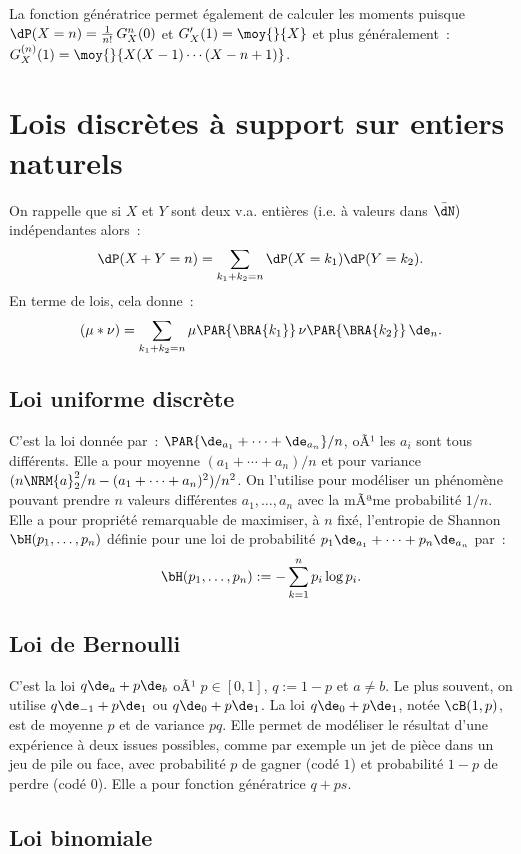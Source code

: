 {{La fonction génératrice permet également de calculer les moments puisque
$\dP(X=n)=\frac{1}{n!}\,G^{n}_X(0)$ et $G_X'(1)=\moy{}{X}$ et plus
généralement~: $G_X^{(n)}(1)=\moy{}{X(X-1)\cdots(X-n+1)}$.


%
\section{Lois discrètes à support sur entiers naturels}
%

On rappelle que si $X$ et $Y$ sont deux v.a. entières (i.e. à valeurs dans
$\bar{\dN})$ indépendantes alors~:
$$
\dP(X+Y=n)=\sum_{k_1+k_2=n}\dP(X=k_1)\dP(Y=k_2).
$$
En terme de lois, cela donne~:
$$
(\mu*\nu)=\sum_{k_1+k_2=n}\mu\PAR{\BRA{k_1}}\,\nu\PAR{\BRA{k_2}}\,\de_n.
$$

%
\subsection{Loi uniforme discrète}\label{ss:loi:uniforme-discrete}
%

C'est la loi donnée par~: $\PAR{\de_{a_1}+\cdots+\de_{a_n}}/n$, oÃ¹ les $a_i$ sont
tous différents. Elle a pour moyenne $(a_1+\cdots+a_n)/n$ et pour variance
$(n\NRM{a}_2^2/n-(a_1+\cdots+a_n)^2)/n^2$. On l'utilise pour modéliser un phénomène
pouvant prendre $n$ valeurs différentes $a_1,\ldots,a_n$ avec la mÃªme probabilité
$1/n$. Elle a pour propriété remarquable de maximiser, à $n$ fixé, l'entropie
de Shannon $\bH(p_1,\ldots,p_n)$ définie pour une loi de probabilité
$p_1\de_{a_1}+\cdots+p_n\de_{a_n}$ par~:
$$
\bH(p_1,\ldots,p_n):=-\sum_{k=1}^n p_i\log p_i.
$$

%
\subsection{Loi de Bernoulli}\label{ss:loi:bernoulli}
%

C'est la loi $q\de_a+p\de_b$ oÃ¹ $p\in[0,1]$, $q:=1-p$ et $a\neq b$. Le plus
souvent, on utilise $q\de_{-1}+p\de_1$ ou $q\de_0+p\de_1$.  La loi
$q\de_0+p\de_1$, notée $\cB(1,p)$, est de moyenne $p$ et de variance $pq$.
Elle permet de modéliser le résultat d'une expérience à deux issues possibles,
comme par exemple un jet de pièce dans un jeu de pile ou face, avec
probabilité $p$ de gagner (codé $1$) et probabilité $1-p$ de perdre (codé
$0$). Elle a pour fonction génératrice $q+ps$.

%
\subsection{Loi binomiale}\label{ss:loi:binomiale}
%

}}
